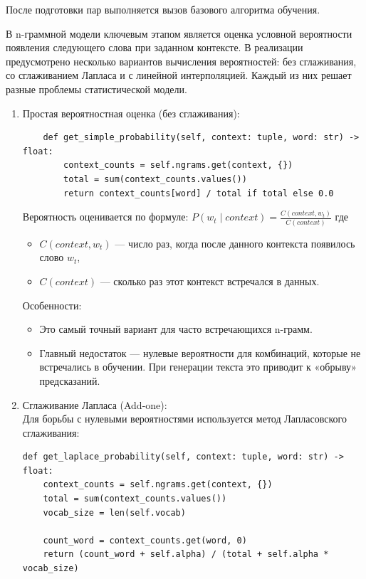 \documentclass[coursework]{SCWorks}
\begin{document}
    После подготовки пар выполняется вызов базового алгоритма обучения.

    В n-граммной модели ключевым этапом является оценка условной вероятности появления следующего слова при заданном контексте.
    В реализации предусмотрено несколько вариантов вычисления вероятностей: без сглаживания, со сглаживанием Лапласа и с
    линейной интерполяцией.
    Каждый из них решает разные проблемы статистической модели.

    \begin{enumerate}
        \item Простая вероятностная оценка (без сглаживания):
        \begin{verbatim}
    def get_simple_probability(self, context: tuple, word: str) -> float:
        context_counts = self.ngrams.get(context, {})
        total = sum(context_counts.values())
        return context_counts[word] / total if total else 0.0
        \end{verbatim}

        Вероятность оценивается по формуле:
        $P(w_t \mid context) = \frac{C(context, w_t)}{C(context)}$
        где
        \begin{itemize}
            \item $C(context, w_t)$ — число раз, когда после данного контекста появилось слово $w_t$,
            \item $C(context)$ — сколько раз этот контекст встречался в данных.
        \end{itemize}
        Особенности:
        \begin{itemize}
            \item Это самый точный вариант для часто встречающихся n-грамм.
            \item Главный недостаток — нулевые вероятности для комбинаций, которые не встречались в обучении.
            При генерации текста это приводит к «обрыву» предсказаний.
        \end{itemize}
        \item Сглаживание Лапласа (Add-one): \\
        Для борьбы с нулевыми вероятностями используется метод Лапласовского сглаживания:
        \begin{verbatim}
def get_laplace_probability(self, context: tuple, word: str) -> float:
    context_counts = self.ngrams.get(context, {})
    total = sum(context_counts.values())
    vocab_size = len(self.vocab)

    count_word = context_counts.get(word, 0)
    return (count_word + self.alpha) / (total + self.alpha * vocab_size)
        \end{verbatim}


\end{enumerate}
\end{document}
